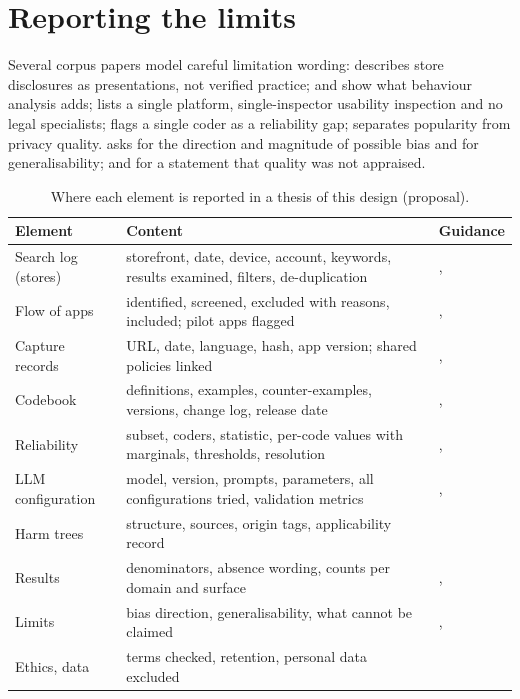 \section{Reporting the limits}
Several corpus papers model careful limitation wording:  describes store disclosures as presentations, not verified practice;  and  show what behaviour analysis adds;  lists a single platform, single-inspector usability inspection and no legal specialists;  flags a single coder as a reliability gap;  separates popularity from privacy quality.  asks for the direction and magnitude of possible bias and for generalisability;  and  for a statement that quality was not appraised.

\begin{table}[t]
\centering\small
\caption{Where each element is reported in a thesis of this design (proposal).}
\label{tab:R-map}
\begin{tabularx}{\textwidth}{@{}P{3.1cm}YP{3.3cm}@{}}
\toprule
\textbf{Element} & \textbf{Content} & \textbf{Guidance}\\
\midrule
Search log (stores) & storefront, date, device, account, keywords, results examined, filters, de-duplication & , \\
Flow of apps & identified, screened, excluded with reasons, included; pilot apps flagged & , \\
Capture records & URL, date, language, hash, app version; shared policies linked & , \\
Codebook & definitions, examples, counter-examples, versions, change log, release date & , \\
Reliability & subset, coders, statistic, per-code values with marginals, thresholds, resolution & , \\
LLM configuration & model, version, prompts, parameters, all configurations tried, validation metrics & , \\
Harm trees & structure, sources, origin tags, applicability record & \\
Results & denominators, absence wording, counts per domain and surface & , \\
Limits & bias direction, generalisability, what cannot be claimed & , \\
Ethics, data & terms checked, retention, personal data excluded & \\
\bottomrule
\end{tabularx}
\end{table}

